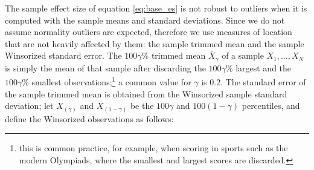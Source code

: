 \documentclass[a4paper,11pt]{kth-mag}
\begin{document}
The sample effect size of equation \ref{eq:base_es} is not robust to outliers when it is computed with the sample means and standard deviations. Since we do not assume normality outliers are expected, therefore we use measures of location that are not heavily affected by them: the sample trimmed mean and the sample Winsorized standard error. The $100\gamma \%$ trimmed mean $\overline{X}_\gamma$ of a sample $X_1,\ldots,X_N$ is simply the mean of that sample after discarding the $100\gamma\%$ largest and the $100\gamma\%$ smallest observations;\footnote{this is common practice, for example, when scoring in sports such as the modern Olympiads, where the smallest and largest scores are discarded.} a common value for $\gamma$ is 0.2. The standard error of the sample trimmed mean is obtained from the Winsorized sample standard deviation; let $X_{(\gamma)}$ and $X_{(1-\gamma)}$ be the $100\gamma$ and $100(1-\gamma)$ percentiles, and define the Winsorized observations as follows:
\end{document}
